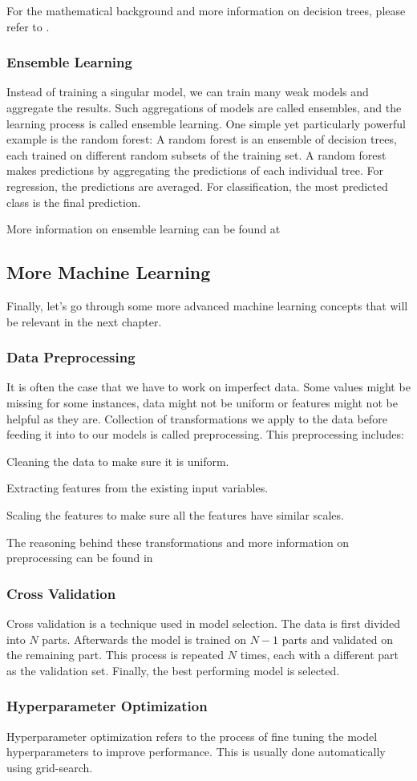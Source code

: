 For the mathematical background and more information on decision trees, please refer to \parencite{homl:6}.

\subsubsection{Ensemble Learning}
Instead of training a singular model, we can train many weak models and aggregate the results.
Such aggregations of models are called ensembles, and the learning process is called ensemble learning.
One simple yet particularly powerful example is the random forest:
A random forest is an ensemble of decision trees, each trained on different random subsets of the training set.
A random forest makes predictions by aggregating the predictions of each individual tree.
For regression, the predictions are averaged.
For classification, the most predicted class is the final prediction.\parencite{homl:7}
 
More information on ensemble learning can be found at \parencite{homl:7}

\subsection{More Machine Learning}
Finally, let's go through some more advanced machine learning concepts that will be relevant in the next chapter.
\subsubsection{Data Preprocessing}
It is often the case that we have to work on imperfect data.
Some values might be missing for some instances, data might not be uniform or features might not be helpful as they are.
Collection of transformations we apply to the data before feeding it into to our models is called preprocessing.\parencite{homl:2}
This preprocessing includes:

Cleaning the data to make sure it is uniform.

Extracting features from the existing input variables.

Scaling the features to make sure all the features have similar scales.

The reasoning behind these transformations and more information on preprocessing can be found in \parencite{homl:2}

\subsubsection{Cross Validation}
Cross validation is a technique used in model selection.
The data is first divided into $N$ parts.
Afterwards the model is trained on $N-1$ parts and validated on the remaining part.
This process is repeated $N$ times, each with a different part as the validation set.
Finally, the best performing model is selected.\parencite{ml:prml}
\subsubsection{Hyperparameter Optimization}
Hyperparameter optimization refers to the process of fine tuning the model hyperparameters to improve performance.
This is usually done automatically using grid-search.\parencite{homl:2} 
